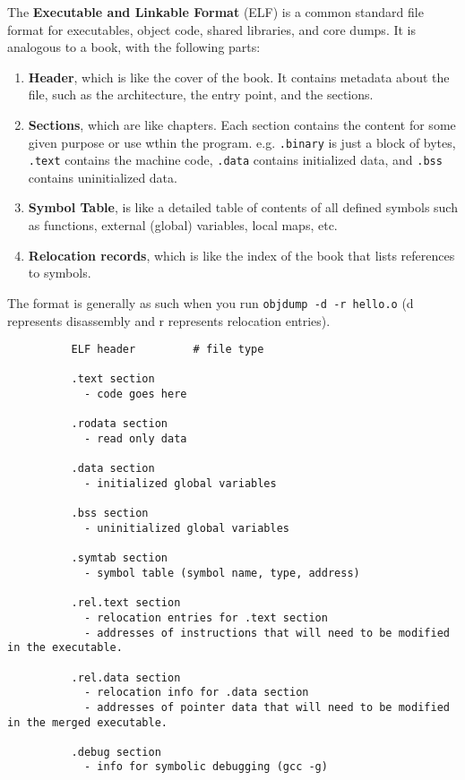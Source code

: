       \begin{definition}[ELF]
        The \textbf{Executable and Linkable Format} (ELF) is a common standard file format for executables, object code, shared libraries, and core dumps. It is analogous to a book, with the following parts: 
        \begin{enumerate}
          \item \textbf{Header}, which is like the cover of the book. It contains metadata about the file, such as the architecture, the entry point, and the sections. 
          \item \textbf{Sections}, which are like chapters. Each section contains the content for some given purpose or use wthin the program. e.g. \texttt{.binary} is just a block of bytes, \texttt{.text} contains the machine code, \texttt{.data} contains initialized data, and \texttt{.bss} contains uninitialized data.
          \item \textbf{Symbol Table}, is like a detailed table of contents of all defined symbols such as functions, external (global) variables, local maps, etc. 
          \item \textbf{Relocation records}, which is like the index of the book that lists references to symbols. 
        \end{enumerate}
        The format is generally as such when you run \texttt{objdump -d -r hello.o} (d represents disassembly and r represents relocation entries).

        \begin{lstlisting}
          ELF header         # file type 

          .text section 
            - code goes here 

          .rodata section
            - read only data 

          .data section 
            - initialized global variables 

          .bss section 
            - uninitialized global variables

          .symtab section 
            - symbol table (symbol name, type, address) 

          .rel.text section 
            - relocation entries for .text section 
            - addresses of instructions that will need to be modified in the executable. 

          .rel.data section 
            - relocation info for .data section 
            - addresses of pointer data that will need to be modified in the merged executable. 

          .debug section 
            - info for symbolic debugging (gcc -g) 
        \end{lstlisting}
      \end{definition}
      
